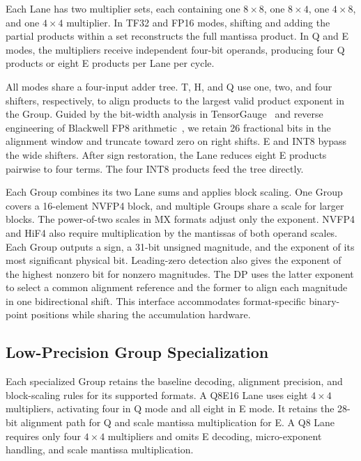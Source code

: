 \documentclass[conference,10pt,letterpaper]{IEEEtran}
\begin{document}
Each Lane has two multiplier sets, each containing one $8\times8$, one $8\times4$, one $4\times8$, and one $4\times4$ multiplier. In TF32 and FP16 modes, shifting and adding the partial products within a set reconstructs the full mantissa product. In Q and E modes, the multipliers receive independent four-bit operands, producing four Q products or eight E products per Lane per cycle.

All modes share a four-input adder tree. T, H, and Q use one, two, and four shifters, respectively, to align products to the largest valid product exponent in the Group. Guided by the bit-width analysis in TensorGauge~\cite{tensorgauge} and reverse engineering of Blackwell FP8 arithmetic~\cite{xie2025mmasim}, we retain 26 fractional bits in the alignment window and truncate toward zero on right shifts. E and INT8 bypass the wide shifters. After sign restoration, the Lane reduces eight E products pairwise to four terms. The four INT8 products feed the tree directly.

Each Group combines its two Lane sums and applies block scaling. One Group covers a 16-element NVFP4 block, and multiple Groups share a scale for larger blocks. The power-of-two scales in MX formats adjust only the exponent. NVFP4 and HiF4 also require multiplication by the mantissas of both operand scales. Each Group outputs a sign, a 31-bit unsigned magnitude, and the exponent of its most significant physical bit. Leading-zero detection also gives the exponent of the highest nonzero bit for nonzero magnitudes. The DP uses the latter exponent to select a common alignment reference and the former to align each magnitude in one bidirectional shift. This interface accommodates format-specific binary-point positions while sharing the accumulation hardware.

\subsection{Low-Precision Group Specialization}
\label{sec:specialized_midgroups}

Each specialized Group retains the baseline decoding, alignment precision, and block-scaling rules for its supported formats. A Q8E16 Lane uses eight $4\times4$ multipliers, activating four in Q mode and all eight in E mode. It retains the 28-bit alignment path for Q and scale mantissa multiplication for E. A Q8 Lane requires only four $4\times4$ multipliers and omits E decoding, micro-exponent handling, and scale mantissa multiplication.
\end{document}
